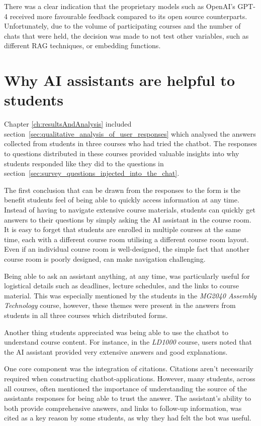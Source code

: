 There was a clear indication that the proprietary models such as OpenAI’s GPT-4 received more favourable feedback compared to its open source counterparts. Unfortunately, due to the volume of participating courses and the number of chats that were held, the decision was made to not test other variables, such as different \gls{RAG} techniques, or embedding functions.


\section{Why AI assistants are helpful to students}


Chapter \ref{ch:resultsAndAnalysis} included section~\ref{sec:qualitative_analysis_of_user_responses} which analysed the answers collected from students in three courses who had tried the chatbot. The responses to questions distributed in these courses provided valuable insights into why students responded like they did to the questions in section~\ref{sec:survey_questions_injected_into_the_chat}.


The first conclusion that can be drawn from the responses to the form is the benefit students feel of being able to quickly access information at any time. Instead of having to navigate extensive course materials, students can quickly get answers to their questions by simply asking the AI assistant in the course room. It is easy to forget that students are enrolled in multiple courses at the same time, each with a different course room utilising a different course room layout. Even if an individual course room is well-designed, the simple fact that another course room is poorly designed, can make navigation challenging.


Being able to ask an assistant anything, at any time, was particularly useful for logistical details such as deadlines, lecture schedules, and the links to course material. This was especially mentioned by the students in the \textit{MG2040 Assembly Technology} course, however, these themes were present in the answers from students in all three courses which distributed forms.


Another thing students appreciated was being able to use the chatbot to understand course content. For instance, in the \textit{LD1000} course, users noted that the AI assistant provided very extensive answers and good explanations.


One core component was the integration of citations. Citations aren’t necessarily required when constructing chatbot-applications. However, many students, across all courses, often mentioned the importance of understanding the source of the assistants responses for being able to trust the answer. The assistant’s ability to both provide comprehensive answers, and links to follow-up information, was cited as a key reason by some students, as why they had felt the bot was useful.


